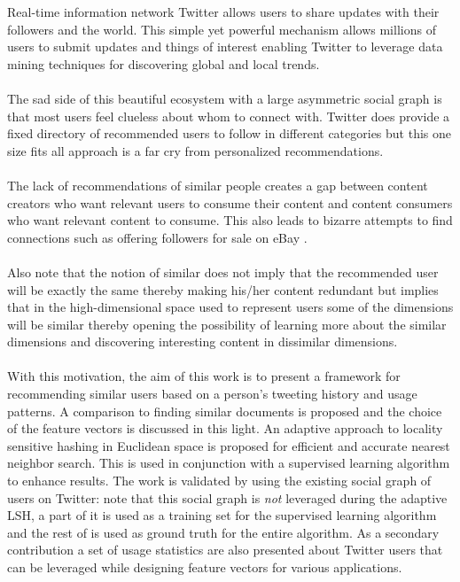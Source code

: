 \documentclass{article}
\begin{document}
Real-time information network Twitter \cite{twitter} allows users to share updates with their followers
and the world. This simple yet powerful mechanism allows millions of users to submit
updates and things of interest enabling Twitter to leverage data mining techniques 
for discovering global and local trends.\\\\
The sad side of this beautiful ecosystem with a large asymmetric social graph 
is that most users feel clueless about whom to connect with. Twitter does provide
a fixed directory of recommended users to follow in different categories but this 
one size fits all approach is a far cry from personalized recommendations.\\\\
The lack of recommendations of similar people creates a gap between content
creators who want relevant users to consume their content and content consumers
who want relevant content to consume. This also leads to bizarre attempts to find
connections such as offering followers for sale on eBay \cite{ebay}.\\\\
Also note that the notion of
similar does not imply that the recommended user will be exactly the same thereby
making his/her content redundant but implies that in the high-dimensional space
used to represent users some of the dimensions will be similar thereby opening the
possibility of learning more about the similar dimensions and discovering interesting
content in dissimilar dimensions.\\\\
With this motivation, the aim of this work is to present a framework for recommending
similar users based on a person's tweeting history and usage patterns. A comparison
to finding similar documents is proposed and the choice of the feature vectors
is discussed in this light. An adaptive approach to locality sensitive hashing in
Euclidean space is proposed for efficient and accurate nearest neighbor search. This is
used in conjunction with a supervised learning algorithm to enhance results. The work
is validated by using the existing social graph of users on Twitter: note that this
social graph is \textit{not} leveraged during the adaptive LSH, a part of it is used
as a training set for the supervised learning algorithm and the rest of is used
as ground truth for the entire algorithm. As a secondary contribution a set of
usage statistics are also presented about Twitter users that can be leveraged while
designing feature vectors for various applications.
\end{document}
